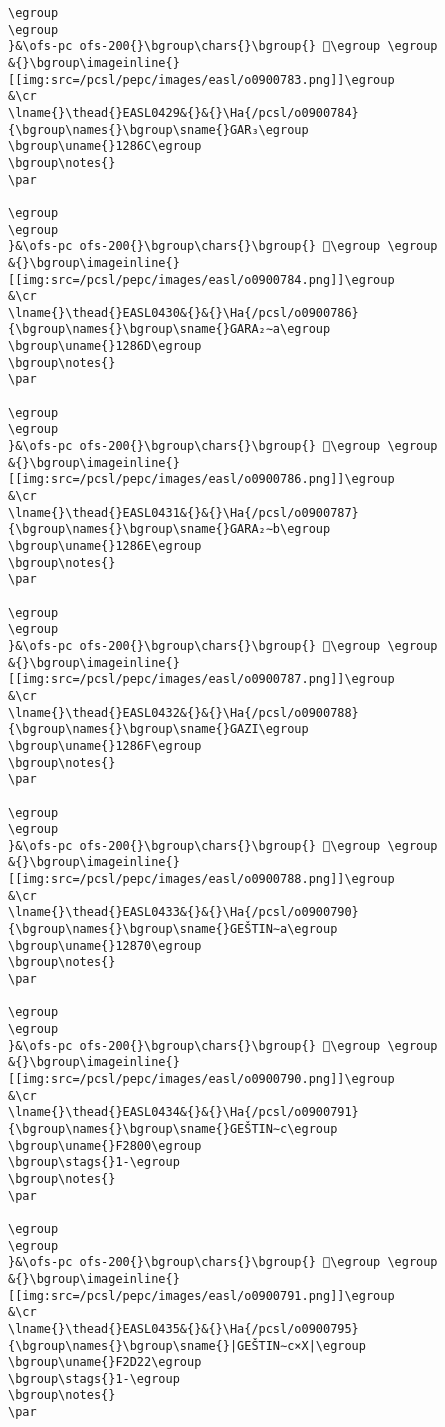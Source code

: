 \begin{verbatim}
\egroup
\egroup
}&\ofs-pc ofs-200{}\bgroup\chars{}\bgroup{} 𒡫\egroup \egroup
&{}\bgroup\imageinline{}[[img:src=/pcsl/pepc/images/easl/o0900783.png]]\egroup
&\cr
\lname{}\thead{}EASL0429&{}&{}\Ha{/pcsl/o0900784}{\bgroup\names{}\bgroup\sname{}GAR₃\egroup
\bgroup\uname{}1286C\egroup
\bgroup\notes{}
\par 

\egroup
\egroup
}&\ofs-pc ofs-200{}\bgroup\chars{}\bgroup{} 𒡬\egroup \egroup
&{}\bgroup\imageinline{}[[img:src=/pcsl/pepc/images/easl/o0900784.png]]\egroup
&\cr
\lname{}\thead{}EASL0430&{}&{}\Ha{/pcsl/o0900786}{\bgroup\names{}\bgroup\sname{}GARA₂∼a\egroup
\bgroup\uname{}1286D\egroup
\bgroup\notes{}
\par 

\egroup
\egroup
}&\ofs-pc ofs-200{}\bgroup\chars{}\bgroup{} 𒡭\egroup \egroup
&{}\bgroup\imageinline{}[[img:src=/pcsl/pepc/images/easl/o0900786.png]]\egroup
&\cr
\lname{}\thead{}EASL0431&{}&{}\Ha{/pcsl/o0900787}{\bgroup\names{}\bgroup\sname{}GARA₂∼b\egroup
\bgroup\uname{}1286E\egroup
\bgroup\notes{}
\par 

\egroup
\egroup
}&\ofs-pc ofs-200{}\bgroup\chars{}\bgroup{} 𒡮\egroup \egroup
&{}\bgroup\imageinline{}[[img:src=/pcsl/pepc/images/easl/o0900787.png]]\egroup
&\cr
\lname{}\thead{}EASL0432&{}&{}\Ha{/pcsl/o0900788}{\bgroup\names{}\bgroup\sname{}GAZI\egroup
\bgroup\uname{}1286F\egroup
\bgroup\notes{}
\par 

\egroup
\egroup
}&\ofs-pc ofs-200{}\bgroup\chars{}\bgroup{} 𒡯\egroup \egroup
&{}\bgroup\imageinline{}[[img:src=/pcsl/pepc/images/easl/o0900788.png]]\egroup
&\cr
\lname{}\thead{}EASL0433&{}&{}\Ha{/pcsl/o0900790}{\bgroup\names{}\bgroup\sname{}GEŠTIN∼a\egroup
\bgroup\uname{}12870\egroup
\bgroup\notes{}
\par 

\egroup
\egroup
}&\ofs-pc ofs-200{}\bgroup\chars{}\bgroup{} 𒡰\egroup \egroup
&{}\bgroup\imageinline{}[[img:src=/pcsl/pepc/images/easl/o0900790.png]]\egroup
&\cr
\lname{}\thead{}EASL0434&{}&{}\Ha{/pcsl/o0900791}{\bgroup\names{}\bgroup\sname{}GEŠTIN∼c\egroup
\bgroup\uname{}F2800\egroup
\bgroup\stags{}1-\egroup
\bgroup\notes{}
\par 

\egroup
\egroup
}&\ofs-pc ofs-200{}\bgroup\chars{}\bgroup{} 󲠀\egroup \egroup
&{}\bgroup\imageinline{}[[img:src=/pcsl/pepc/images/easl/o0900791.png]]\egroup
&\cr
\lname{}\thead{}EASL0435&{}&{}\Ha{/pcsl/o0900795}{\bgroup\names{}\bgroup\sname{}|GEŠTIN∼c×X|\egroup
\bgroup\uname{}F2D22\egroup
\bgroup\stags{}1-\egroup
\bgroup\notes{}
\par 


\end{verbatim}

